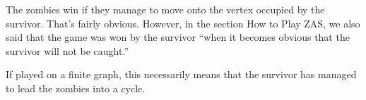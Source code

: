 
The zombies win if they manage to move onto the vertex occupied by the survivor. That's fairly obvious. 
However, in the section How to Play ZAS, we also said that the game was won by the survivor ``when it becomes obvious that the survivor will not be caught.''

If played on a finite graph, this necessarily means that the survivor has managed to lead
the zombies into a cycle. 



